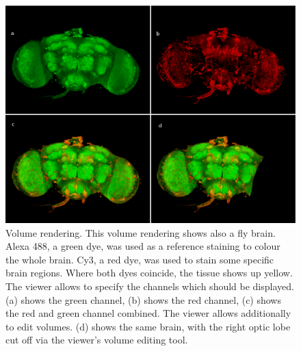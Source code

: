 \documentclass[a4paper,10pt]{article}
\begin{document}
\begin{figure}[m]
\centering
\includegraphics[width=\textwidth]{images/volume_montage}
\caption {Volume rendering. This volume rendering shows also a fly brain. Alexa 488, a green dye, was used as a reference staining to colour the whole brain. Cy3, a red dye, was used to stain some specific brain regions. Where both dyes coincide, the tissue shows up yellow. The viewer allows to specify the channels which should be displayed. (a) shows the green channel, (b) shows the red channel, (c) shows the red and green channel combined. The viewer allows additionally to edit volumes. (d) shows the same brain, with the right optic lobe cut off via the viewer's volume editing tool.}
\label{fig:volume}
\end{figure}
\end{document}
